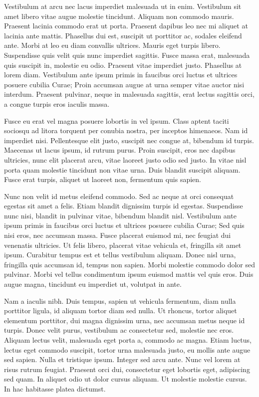 Vestibulum at arcu nec lacus imperdiet malesuada ut in enim. Vestibulum sit amet libero vitae augue molestie tincidunt. Aliquam non commodo mauris. Praesent lacinia commodo erat ut porta. Praesent dapibus leo nec mi aliquet at lacinia ante mattis. Phasellus dui est, suscipit ut porttitor ac, sodales eleifend ante. Morbi at leo eu diam convallis ultrices. Mauris eget turpis libero. Suspendisse quis velit quis nunc imperdiet sagittis. Fusce massa erat, malesuada quis suscipit in, molestie eu odio. Praesent vitae imperdiet justo. Phasellus at lorem diam. Vestibulum ante ipsum primis in faucibus orci luctus et ultrices posuere cubilia Curae; Proin accumsan augue at urna semper vitae auctor nisi interdum. Praesent pulvinar, neque in malesuada sagittis, erat lectus sagittis orci, a congue turpis eros iaculis massa.

Fusce eu erat vel magna posuere lobortis in vel ipsum. Class aptent taciti sociosqu ad litora torquent per conubia nostra, per inceptos himenaeos. Nam id imperdiet nisi. Pellentesque elit justo, suscipit nec congue at, bibendum id turpis. Maecenas ut lacus ipsum, id rutrum purus. Proin suscipit, eros nec dapibus ultricies, nunc elit placerat arcu, vitae laoreet justo odio sed justo. In vitae nisl porta quam molestie tincidunt non vitae urna. Duis blandit suscipit aliquam. Fusce erat turpis, aliquet ut laoreet non, fermentum quis sapien.

Nunc non velit id metus eleifend commodo. Sed ac neque at orci consequat egestas sit amet a felis. Etiam blandit dignissim turpis id egestas. Suspendisse nunc nisi, blandit in pulvinar vitae, bibendum blandit nisl. Vestibulum ante ipsum primis in faucibus orci luctus et ultrices posuere cubilia Curae; Sed quis nisi eros, nec accumsan massa. Fusce placerat euismod mi, nec feugiat dui venenatis ultricies. Ut felis libero, placerat vitae vehicula et, fringilla sit amet ipsum. Curabitur tempus est et tellus vestibulum aliquam. Donec nisl urna, fringilla quis accumsan id, tempus non sapien. Morbi molestie commodo dolor sed pulvinar. Morbi vel tellus condimentum ipsum euismod mattis vel quis eros. Duis augue magna, tincidunt eu imperdiet ut, volutpat in ante.

Nam a iaculis nibh. Duis tempus, sapien ut vehicula fermentum, diam nulla porttitor ligula, id aliquam tortor diam sed nulla. Ut rhoncus, tortor aliquet elementum porttitor, dui magna dignissim urna, nec accumsan metus neque id turpis. Donec velit purus, vestibulum ac consectetur sed, molestie nec eros. Aliquam lectus velit, malesuada eget porta a, commodo ac magna. Etiam luctus, lectus eget commodo suscipit, tortor urna malesuada justo, eu mollis ante augue sed sapien. Nulla et tristique ipsum. Integer sed arcu ante. Nunc vel lorem at risus rutrum feugiat. Praesent orci dui, consectetur eget lobortis eget, adipiscing sed quam. In aliquet odio ut dolor cursus aliquam. Ut molestie molestie cursus. In hac habitasse platea dictumst.

